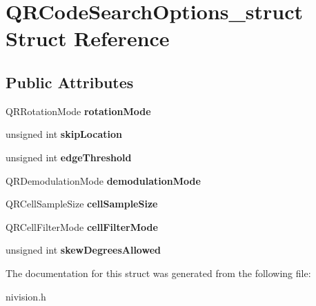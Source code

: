 \hypertarget{structQRCodeSearchOptions__struct}{\section{\-Q\-R\-Code\-Search\-Options\-\_\-struct \-Struct \-Reference}
\label{structQRCodeSearchOptions__struct}
}
\subsection*{\-Public \-Attributes}
\begin{DoxyCompactItemize}
\item 
\hypertarget{structQRCodeSearchOptions__struct_afcc00e9b2afac82b46844b8ec95bd5ef}{\-Q\-R\-Rotation\-Mode {\bfseries rotation\-Mode}}\label{structQRCodeSearchOptions__struct_afcc00e9b2afac82b46844b8ec95bd5ef}

\item 
\hypertarget{structQRCodeSearchOptions__struct_acc663bf2d340c04ebc9b8467a7ea4228}{unsigned int {\bfseries skip\-Location}}\label{structQRCodeSearchOptions__struct_acc663bf2d340c04ebc9b8467a7ea4228}

\item 
\hypertarget{structQRCodeSearchOptions__struct_ae3ac9367cdd9c6941114e87164538e7f}{unsigned int {\bfseries edge\-Threshold}}\label{structQRCodeSearchOptions__struct_ae3ac9367cdd9c6941114e87164538e7f}

\item 
\hypertarget{structQRCodeSearchOptions__struct_a0b15cde5efa49d38b234d147425977b9}{\-Q\-R\-Demodulation\-Mode {\bfseries demodulation\-Mode}}\label{structQRCodeSearchOptions__struct_a0b15cde5efa49d38b234d147425977b9}

\item 
\hypertarget{structQRCodeSearchOptions__struct_ae85dbc04d29272821566a88e0047e9b0}{\-Q\-R\-Cell\-Sample\-Size {\bfseries cell\-Sample\-Size}}\label{structQRCodeSearchOptions__struct_ae85dbc04d29272821566a88e0047e9b0}

\item 
\hypertarget{structQRCodeSearchOptions__struct_ac5c77133205cec63c94cf6fcd0609172}{\-Q\-R\-Cell\-Filter\-Mode {\bfseries cell\-Filter\-Mode}}\label{structQRCodeSearchOptions__struct_ac5c77133205cec63c94cf6fcd0609172}

\item 
\hypertarget{structQRCodeSearchOptions__struct_a4db583002ed78c0dd3cccab61db4b0f7}{unsigned int {\bfseries skew\-Degrees\-Allowed}}\label{structQRCodeSearchOptions__struct_a4db583002ed78c0dd3cccab61db4b0f7}

\end{DoxyCompactItemize}


\-The documentation for this struct was generated from the following file\-:\begin{DoxyCompactItemize}
\item 
nivision.\-h\end{DoxyCompactItemize}
